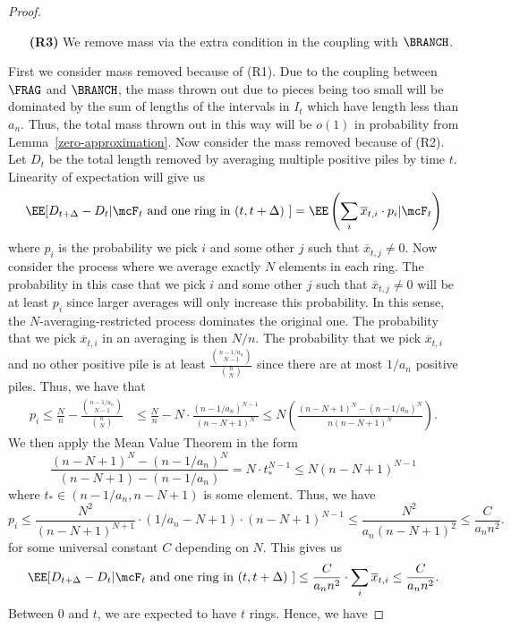 \documentclass[12pt]{article}
\begin{document}
\begin{proof}
\begin{enumerate}
		\item[\textbf{(R3)}] We remove mass via the extra condition in the coupling with $\BRANCH$. 
	\end{enumerate} 
	First we consider mass removed because of (R1). Due to the coupling between $\FRAG$ and $\BRANCH$, the mass thrown out due to pieces being too small will be dominated by the sum of lengths of the intervals in $I_t$ which have length less than $a_n$. Thus, the total mass thrown out in this way will be $o(1)$ in probability from Lemma~\ref{zero-approximation}. Now consider the mass removed because of (R2). Let $D_t$ be the total length removed by averaging multiple positive piles by time $t$. Linearity of expectation will give us
	\[
		\EE [ D_{t + \Delta} - D_t | \mcF_t \text{ and one ring in $(t, t + \Delta)$ } ] = \EE \left ( \sum_i \overline{x}_{t, i} \cdot p_{i} | \mcF_t \right )
	\]
	where $p_i$ is the probability we pick $i$ and some other $j$ such that $\overline{x}_{t, j} \neq 0$. Now consider the process where we average exactly $N$ elements in each ring. The probability in this case that we pick $i$ and some other $j$ such that $\overline{x}_{t, j} \neq 0$ will be at least $p_i$ since larger averages will only increase this probability. In this sense, the $N$-averaging-restricted process dominates the original one. The probability that we pick $\overline{x}_{t, i}$ in an averaging is then $N / n$. The probability that we pick $\overline{x}_{t, i}$ and no other positive pile is at least $\frac{\binom{n - 1/a_n}{N-1}}{\binom{n}{N}}$ since there are at most $1/a_n$ positive piles. Thus, we have that
	\begin{align*}
		p_i \leq \frac{N}{n} - \frac{\binom{n-1/a_n}{N-1}}{\binom{n}{N}} & \leq \frac{N}{n} - N \cdot \frac{(n-1/a_n)^{N-1}}{(n-N+1)^N} \leq N \left ( \frac{(n-N+1)^N - (n-1/a_n)^N}{n(n-N+1)^N} \right ). 
	\end{align*}
	We then apply the Mean Value Theorem in the form
	\[
		\frac{(n-N+1)^N - (n-1/a_n)^N}{(n-N+1) - (n-1/a_n)} = N \cdot t_*^{N-1} \leq N (n-N+1)^{N-1}
	\]
	where $t_* \in (n-1/a_n, n-N+1)$ is some element. Thus, we have
	\[
		p_i \leq \frac{N^2}{(n-N+1)^{N+1}} \cdot (1/a_n - N + 1) \cdot (n-N+1)^{N-1} \leq \frac{N^2}{a_n (n-N+1)^2} \leq \frac{C}{a_n n^2}.
	\]
	for some universal constant $C$ depending on $N$. This gives us 
	\[
		\EE [ D_{t + \Delta} - D_t | \mcF_t \text{ and one ring in $(t, t + \Delta)$ } ] \leq \frac{C}{a_n n^2} \cdot \sum_i \overline{x}_{t, i} \leq \frac{C}{a_n n^2}.
	\]
	Between $0$ and $t$, we are expected to have $t$ rings. Hence, we have 

\end{proof}
\end{document}
